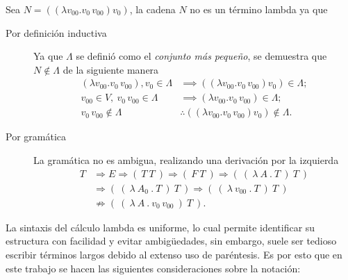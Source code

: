 \begin{exmp} Sea \( N = ((λv_{00}.v_{0}\, v_{00}) v_{0}) \), la cadena \( N \) no es un término lambda ya que

  \begin{description}
  \item[Por definición inductiva] Ya que \( Λ \) se definió como el \emph{conjunto más pequeño}, se demuestra que \( N \not\in Λ \) de la siguiente manera
    \begin{align*}
      (λv_{00}.v_{0}\, v_{00}), v_{0} \in Λ &\implies ((λv_{00}.v_{0}\, v_{00}) v_{0}) \in Λ; \\
      v_{00} \in V,\ v_{0}\, v_{00} \in Λ &\implies (λv_{00}.v_{0}\, v_{00}) \in Λ; \\
      v_{0}\, v_{00} \not\in Λ &\therefore ((λv_{00}.v_{0}\, v_{00}) v_{0}) \not\in Λ.
    \end{align*}
  \item[Por gramática] La gramática no es ambigua, realizando una derivación por la izquierda
    \begin{align*}
      T &\Rightarrow E \Rightarrow (\ T\ T\ ) \Rightarrow (\ F\ T\ ) \Rightarrow (\ (\ λ\ A\ .\ T\ )\ T\ ) \\
        &\Rightarrow (\ (\ λ\ A_{0}\ .\ T\ )\ T\ ) \Rightarrow (\ (\ λ\ v_{00}\ .\ T\ )\ T\ ) \\
        &\nRightarrow (\ (\ λ\ A\ .\ v_{0}\, v_{00}\ )\ T\ ).
    \end{align*}
  \end{description}
\end{exmp}

La sintaxis del cálculo lambda es uniforme, lo cual permite identificar su estructura con facilidad y evitar ambigüedades, sin embargo, suele ser tedioso escribir términos largos debido al extenso uso de paréntesis. Es por esto que en este trabajo se hacen las siguientes consideraciones sobre la notación:

